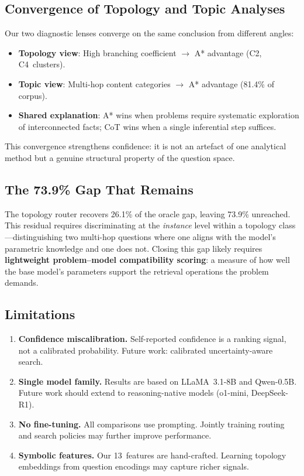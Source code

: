 \documentclass[11pt]{article}
\begin{document}
\subsection{Convergence of Topology and Topic Analyses}

Our two diagnostic lenses converge on the same conclusion from different angles:
\begin{itemize}[leftmargin=1.5em,itemsep=2pt]
\item \textbf{Topology view}: High branching coefficient $\rightarrow$ A* advantage (C2, C4~clusters).
\item \textbf{Topic view}: Multi-hop content categories $\rightarrow$ A* advantage (81.4\% of corpus).
\item \textbf{Shared explanation}: A* wins when problems require systematic exploration of interconnected facts; CoT wins when a single inferential step suffices.
\end{itemize}
This convergence strengthens confidence: it is not an artefact of one analytical method but a genuine structural property of the question space.

\subsection{The 73.9\% Gap That Remains}

The topology router recovers 26.1\% of the oracle gap, leaving 73.9\% unreached. This residual requires discriminating at the \emph{instance} level within a topology class---distinguishing two multi-hop questions where one aligns with the model's parametric knowledge and one does not. Closing this gap likely requires \textbf{lightweight problem--model compatibility scoring}: a measure of how well the base model's parameters support the retrieval operations the problem demands.

\subsection{Limitations}

\begin{enumerate}[leftmargin=1.5em,itemsep=3pt]
\item \textbf{Confidence miscalibration.} Self-reported confidence is a ranking signal, not a calibrated probability. Future work: calibrated uncertainty-aware search.
\item \textbf{Single model family.} Results are based on LLaMA~3.1-8B and Qwen-0.5B. Future work should extend to reasoning-native models (o1-mini, DeepSeek-R1).
\item \textbf{No fine-tuning.} All comparisons use prompting. Jointly training routing and search policies may further improve performance.
\item \textbf{Symbolic features.} Our 13~features are hand-crafted. Learning topology embeddings from question encodings may capture richer signals.
\end{enumerate}
\end{document}
